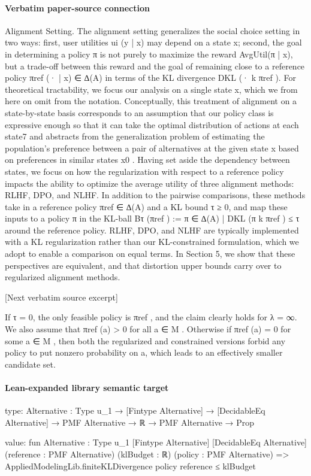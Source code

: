 \documentclass[10pt]{article}
\begin{document}
\paragraph{Verbatim paper-source connection}
\begin{ReviewVerbatim}
Alignment Setting. The alignment setting generalizes the social choice setting in two ways: first,
user utilities ui (y | x) may depend on a state x; second, the goal in determining a policy π is not
purely to maximize the reward AvgUtil(π | x), but a trade-off between this reward and the goal of
remaining close to a reference policy πref (· | x) ∈ ∆(A) in terms of the KL divergence DKL (· k πref ).
For theoretical tractability, we focus our analysis on a single state x, which we from here on omit
from the notation. Conceptually, this treatment of alignment on a state-by-state basis corresponds to
an assumption that our policy class is expressive enough so that it can take the optimal distribution of
actions at each state7 and abstracts from the generalization problem of estimating the population’s
preference between a pair of alternatives at the given state x based on preferences in similar states x0 .
Having set aside the dependency between states, we focus on how the regularization with respect
to a reference policy impacts the ability to optimize the average utility of three alignment methods:
RLHF, DPO, and NLHF. In addition to the pairwise comparisons, these methods take in a reference
policy πref ∈ ∆(A) and a KL bound τ ≥ 0, and map these inputs to a policy π in the KL-ball
Bτ (πref ) := {π ∈ ∆(A) | DKL (π k πref ) ≤ τ } around the reference policy. RLHF, DPO, and NLHF
are typically implemented with a KL regularization rather than our KL-constrained formulation,
which we adopt to enable a comparison on equal terms. In Section 5, we show that these perspectives
are equivalent, and that distortion upper bounds carry over to regularized alignment methods.

[Next verbatim source excerpt]

      If τ = 0, the only feasible policy is πref , and the claim clearly holds for λ = ∞. We also assume that
πref (a) > 0 for all a ∈ M . Otherwise if πref (a) = 0 for some a ∈ M , then both the regularized and constrained
versions forbid any policy to put nonzero probability on a, which leads to an effectively smaller candidate set.
\end{ReviewVerbatim}



\paragraph{Lean-expanded library semantic target}
\begin{ReviewVerbatim}
type:
{Alternative : Type u_1} →
  [Fintype Alternative] → [DecidableEq Alternative] → PMF Alternative → ℝ → PMF Alternative → Prop

value:
fun {Alternative : Type u_1} [Fintype Alternative] [DecidableEq Alternative] (reference : PMF Alternative)
    (klBudget : ℝ) (policy : PMF Alternative) =>
  AppliedModelingLib.finiteKLDivergence policy reference ≤ klBudget
\end{ReviewVerbatim}
\end{document}
